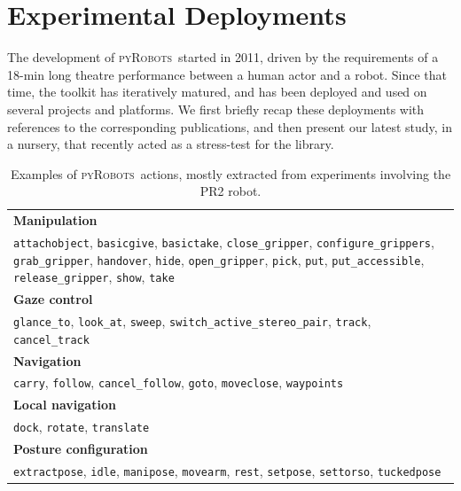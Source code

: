 \documentclass[a4paper, 10pt, conference]{ieeeconf}      %
\newcommand{\pyRobots}{\textsc{pyRobots}\ }
\begin{document}
\section{Experimental Deployments}

The development of \pyRobots started in 2011, driven by the requirements of a
18-min long theatre performance between a human actor and a robot. Since that time, the toolkit has
iteratively matured, and has been deployed and used on several projects and
platforms. We first briefly recap these deployments with references to the
corresponding publications, and then present our latest study, in a nursery,
that recently acted as a stress-test for the library.

\begin{table}[ht!]
\begin{center}
\begin{tabular}{p{}}
    \toprule
    {\bf Manipulation} \\
     {\tt attachobject}, {\tt basicgive}, {\tt basictake}, {\tt close\_gripper}, {\tt configure\_grippers}, {\tt grab\_gripper}, {\tt handover}, {\tt hide}, {\tt open\_gripper}, {\tt pick}, {\tt put}, {\tt put\_accessible}, {\tt release\_gripper}, {\tt show}, {\tt take} \\
     \midrule
    {\bf Gaze control} \\
     {\tt glance\_to}, {\tt look\_at}, {\tt sweep}, {\tt switch\_active\_stereo\_pair}, {\tt track}, {\tt cancel\_track} \\
     \midrule
    {\bf Navigation} \\
     {\tt carry}, {\tt follow}, {\tt cancel\_follow}, {\tt goto}, {\tt moveclose}, {\tt waypoints} \\
     \midrule
    {\bf Local navigation} \\
     {\tt dock}, {\tt rotate}, {\tt translate} \\
     \midrule
    {\bf Posture configuration} \\
     {\tt extractpose}, {\tt idle}, {\tt manipose}, {\tt movearm}, {\tt rest}, {\tt setpose}, {\tt settorso}, {\tt tuckedpose} \\
     \bottomrule
\end{tabular}
\end{center}
\caption{Examples of \pyRobots actions, mostly extracted from experiments involving
    the PR2 robot.}

\label{pyrobots_actions}
\end{table}
\end{document}

